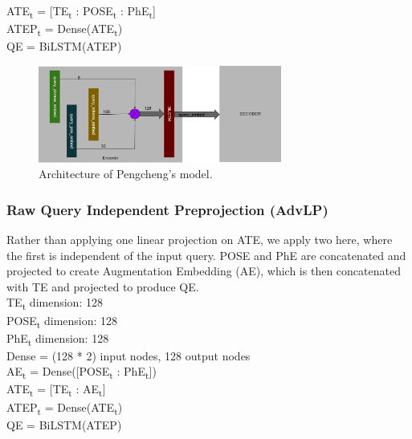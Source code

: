 \documentclass{IEEEtran}
\begin{document}
        \hspace*{-3.5mm}ATE\textsubscript{t} = [TE\textsubscript{t} : 
        POSE\textsubscript{t} : PhE\textsubscript{t}] \\
        ATEP\textsubscript{t} = Dense(ATE\textsubscript{t}) \\
        QE = BiLSTM(ATEP) \\

        \begin{figure}[h]
          \centering
          \includegraphics[width=8cm]{lprd.png}
          \caption{Architecture of Pengcheng's model.}
          \label{fig:lprd}
        \end{figure}

        \subsubsection{Raw Query Independent Preprojection (AdvLP)}
        Rather than applying one linear projection on ATE, we apply two here, where the first is 
        independent of the input query. POSE and PhE are concatenated and projected to create
        Augmentation Embedding (AE), which is then concatenated with TE and projected to produce
        QE. \\

        \hspace*{-3.5mm}TE\textsubscript{t} dimension: 128 \\
        POSE\textsubscript{t} dimension: 128 \\
        PhE\textsubscript{t} dimension: 128 \\
        Dense = (128 * 2) input nodes, 128 output nodes \\ 

        \hspace*{-3.5mm}AE\textsubscript{t} = Dense([POSE\textsubscript{t} : 
        PhE\textsubscript{t}]) \\
        ATE\textsubscript{t} = [TE\textsubscript{t} : AE\textsubscript{t}] \\
        ATEP\textsubscript{t} = Dense(ATE\textsubscript{t}) \\
        QE = BiLSTM(ATEP) \\
\end{document}
